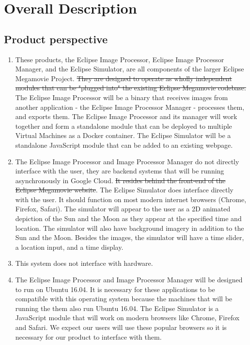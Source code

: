 \documentclass[10pt, onecolumn, draftclsnofoot, letterpaper, compsoc]{IEEEtran}
\begin{document}
\section{Overall Description}
\subsection{Product perspective}
	\begin{enumerate}
		\item These products, the Eclipse Image Processor, Eclipse Image
		Processor Manager, and the Eclipse Simulator, are all components of 
		the larger Eclipse Megamovie Project. \sout{They are designed to operate as wholly 
		independent modules that can be "plugged into" the existing 
		Eclipse Megamovie codebase.} The Eclipse Image Processor will be
		a binary that receives images from another application - the Eclipse
		Image Processor Manager - processes them, and exports them. The Eclipse 
		Image Processor and its manager will work together and form a standalone module
		that can be deployed to multiple Virtual Machines as a Docker container.
		The Eclipse Simulator will be a standalone JavaScript module that can be added to an 
		existing webpage.

		\item The Eclipse Image Processor and Image Processor Manager 
		do not directly interface with the user, they are backend 
		systems that will be running asynchronously in Google Cloud.
		\sout{It resides behind the front-end of the Eclipse
		Megamovie website}. The Eclipse Simulator does interface 
		directly with the user. It should function on most modern 
		internet browsers (Chrome, Firefox, Safari). The simulator 
		will appear to the user as a 2D animated depiction of the 
		Sun and the Moon as they appear at the specified time and 
		location. The simulator will also have background imagery in
		addition to the Sun and the Moon. Besides the images, the
		simulator will have a time slider, a location input, and a
		time display.

		\item This system does not interface with hardware.

		\item The Eclipse Image Processor and Image Processor Manager 
		will be designed to run on Ubuntu 16.04. It is necessary for these 
		applications to be compatible with this operating system because 
		the machines that will be running the them also run Ubuntu 16.04. The Eclipse 
		Simulator is a JavaScript module that will work on modern 
		browsers like Chrome, Firefox and Safari. We expect our 
		users will use these popular browsers so it is necessary 
		for our product to interface with them.      
	\end{enumerate}
\end{document}
